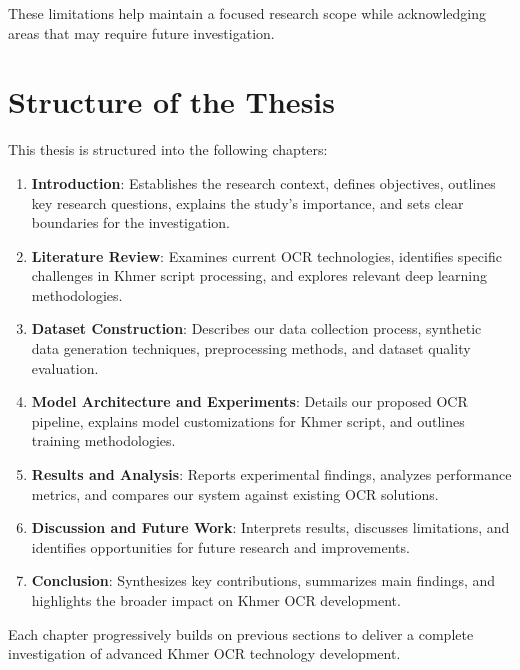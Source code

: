 These limitations help maintain a focused research scope while acknowledging areas that may require future investigation.

\section{Structure of the Thesis}
\label{sec:structure}

This thesis is structured into the following chapters:

\begin{enumerate}
   \item \textbf{Introduction}: Establishes the research context, defines objectives, outlines key research questions, explains the study's importance, and sets clear boundaries for the investigation.
   
   \item \textbf{Literature Review}: Examines current OCR technologies, identifies specific challenges in Khmer script processing, and explores relevant deep learning methodologies.
   
   \item \textbf{Dataset Construction}: Describes our data collection process, synthetic data generation techniques, preprocessing methods, and dataset quality evaluation.
   
   \item \textbf{Model Architecture and Experiments}: Details our proposed OCR pipeline, explains model customizations for Khmer script, and outlines training methodologies.
   
   \item \textbf{Results and Analysis}: Reports experimental findings, analyzes performance metrics, and compares our system against existing OCR solutions.
   
   \item \textbf{Discussion and Future Work}: Interprets results, discusses limitations, and identifies opportunities for future research and improvements.
   
   \item \textbf{Conclusion}: Synthesizes key contributions, summarizes main findings, and highlights the broader impact on Khmer OCR development.
\end{enumerate}

Each chapter progressively builds on previous sections to deliver a complete investigation of advanced Khmer OCR technology development.